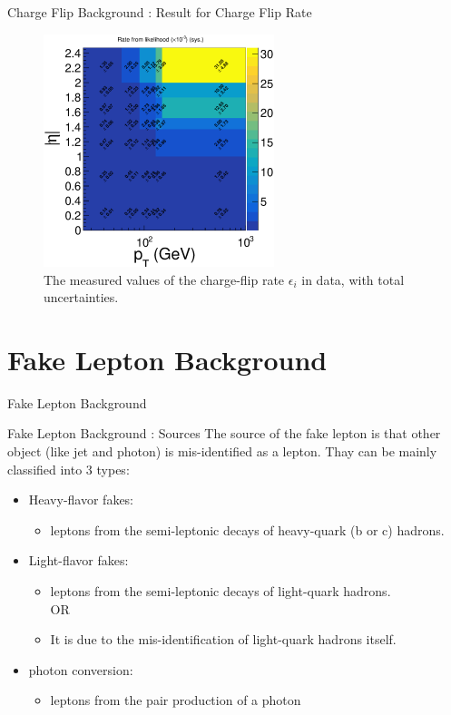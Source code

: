 \documentclass[mathserif,serif]{beamer}
\begin{document}
\begin{frame}{Charge Flip Background : Result for Charge Flip Rate}
\begin{figure}
\centering
\includegraphics[width=0.6\textwidth]{data/plot/charge_flip/FitPlots/data_cf_rate_tot.eps}
\caption{The measured values of the charge-flip rate $\epsilon_i$ in data, with total uncertainties.}
\label{fig:charge_flip_data_tot}
\end{figure}
\end{frame}

\section{Fake Lepton Background}
\begin{frame}
\begin{center}
\huge
Fake Lepton Background
\end{center}
\end{frame}

\begin{frame}{Fake Lepton Background : Sources}
The source of the fake lepton is that other object (like jet and photon) is mis-identified as a lepton. Thay can be mainly classified into 3 types:
\begin{itemize}
\item Heavy-flavor fakes:
\begin{itemize}
\item leptons from the semi-leptonic decays of heavy-quark (b or c) hadrons.
\end{itemize}
\item Light-flavor fakes:
\begin{itemize}
\item leptons from the semi-leptonic decays of light-quark hadrons. \\ OR
\item It is due to the mis-identification of light-quark hadrons itself.
\end{itemize}
\item photon conversion:
\begin{itemize}
\item leptons from the pair production of a photon
\end{itemize}
\end{itemize}
\end{frame}
\end{document}
